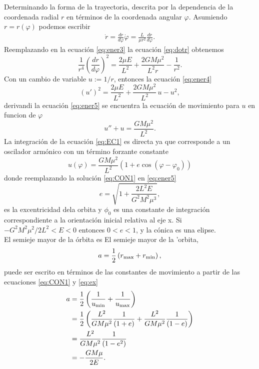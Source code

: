 Determinando la forma de la trayectoria, descrita por la dependencia de la coordenada radial $r$ en términos de la coordenada angular $\varphi$. Asumiendo $r=r(\varphi)$ podemos escribir
\begin{eqnarray}
    \dot{r}=\frac{dr}{d\varphi}\dot{\varphi}=\frac{L}{\mu r^2}\frac{dr}{d\varphi}.
    \label{eq:dotr}
\end{eqnarray}
Reemplazando en la ecuación \ref{eq:ener3} la ecuación \ref{eq:dotr} obtenemos
\begin{equation}
    \frac{1}{r^4}\left(\frac{dr}{d\varphi}\right)^2=\frac{2\mu E}{L^2}+\frac{2GM\mu^2}{L^2r}-\frac{1}{r^2}.\label{eq:ener4}
\end{equation}
Con un cambio de variable $u:=1/r$, entonces la ecuación \ref{eq:ener4}
\begin{equation}
    (u')^2=\frac{2\mu E}{L^2}+\frac{2GM\mu^2}{L^2}\,u-u^{2
    },\label{eq:ener5}
    \end{equation}
derivandi la ecuación \ref{eq:ener5} se encuentra la ecuación de movimiento para $u$ en funcion de $\varphi$
\begin{equation}
    u''+u=\frac{GM\mu^2}{L^2}.\label{eq:EC1}
\end{equation}
La integración de la ecuación \ref{eq:EC1} es directa ya que corresponde a un oscilador armónico con un término forzante constante
\begin{equation}
    u(\varphi)=\frac{GM\mu^2}{L^2}\left(1+e\cos
    (\varphi-\varphi_0)\right)\label{eq:CON1}
\end{equation}
donde reemplazando la solución \ref{eq:CON1} en \ref{eq:ener5}
\begin{equation}
    e=\sqrt{1+\frac{2L^2E}{G^2M^2\mu^3}}, \label{eq:ex}
\end{equation}
es la excentricidad dela orbita y $\phi_0$ es una constante de integración correspondiente a la orientación inicial relativa al eje x.
Si $-G^2M^2\mu^2/2L^2<E<0$ entonces $0<e<1$, y la cónica es una elipse.\\
El semieje mayor de la órbita es 
El semieje mayor de la 'orbita,
\begin{equation*}
a=\frac{1}{2}\left(r_{\rm max}+r_{\rm min}\right),
\end{equation*}
puede ser escrito en términos de las constantes de movimiento a partir de las ecuaciones \ref{eq:CON1} y \ref{eq:ex}
\begin{align*}
    a & = \frac{1}{2}\left(\frac{1}{u_{\rm min}}+\frac{1}{u_{\rm max}}\right) \\
    & = \frac{1}{2}\left(\frac{L^2}{GM\mu^2}\frac{1}{(1+e)}+\frac{L^2}{GM\mu^2}\frac{1}{(1-e)}\right) \\
    & = \frac{L^2}{GM\mu^2}\frac{1}{(1-e^2)} \\
    & = -\frac{GM\mu}{2E}.
    \end{align*}

